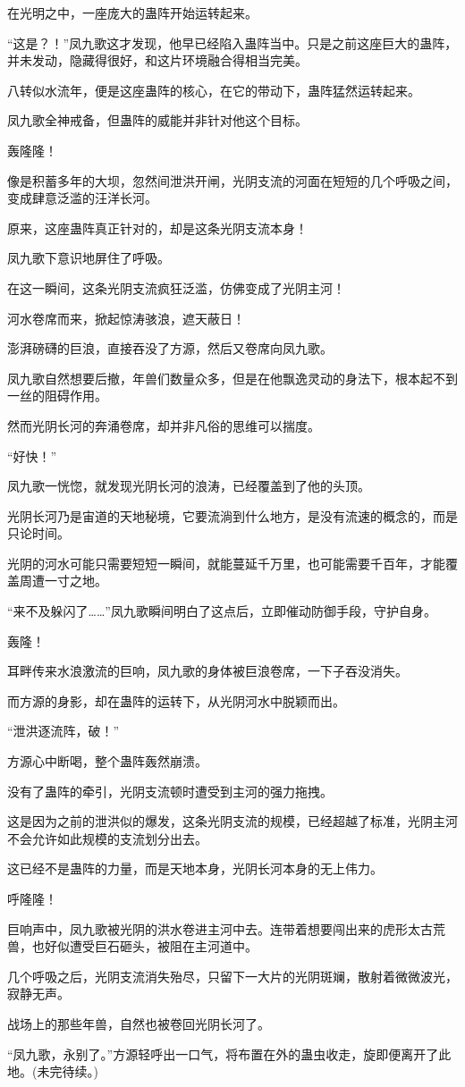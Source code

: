 \begin{this_body}
在光明之中，一座庞大的蛊阵开始运转起来。

“这是？！”凤九歌这才发现，他早已经陷入蛊阵当中。只是之前这座巨大的蛊阵，并未发动，隐藏得很好，和这片环境融合得相当完美。

八转似水流年，便是这座蛊阵的核心，在它的带动下，蛊阵猛然运转起来。

凤九歌全神戒备，但蛊阵的威能并非针对他这个目标。

轰隆隆！

像是积蓄多年的大坝，忽然间泄洪开闸，光阴支流的河面在短短的几个呼吸之间，变成肆意泛滥的汪洋长河。

原来，这座蛊阵真正针对的，却是这条光阴支流本身！

凤九歌下意识地屏住了呼吸。

在这一瞬间，这条光阴支流疯狂泛滥，仿佛变成了光阴主河！

河水卷席而来，掀起惊涛骇浪，遮天蔽日！

澎湃磅礴的巨浪，直接吞没了方源，然后又卷席向凤九歌。

凤九歌自然想要后撤，年兽们数量众多，但是在他飘逸灵动的身法下，根本起不到一丝的阻碍作用。

然而光阴长河的奔涌卷席，却并非凡俗的思维可以揣度。

“好快！”

凤九歌一恍惚，就发现光阴长河的浪涛，已经覆盖到了他的头顶。

光阴长河乃是宙道的天地秘境，它要流淌到什么地方，是没有流速的概念的，而是只论时间。

光阴的河水可能只需要短短一瞬间，就能蔓延千万里，也可能需要千百年，才能覆盖周遭一寸之地。

“来不及躲闪了……”凤九歌瞬间明白了这点后，立即催动防御手段，守护自身。

轰隆！

耳畔传来水浪激流的巨响，凤九歌的身体被巨浪卷席，一下子吞没消失。

而方源的身影，却在蛊阵的运转下，从光阴河水中脱颖而出。

“泄洪逐流阵，破！”

方源心中断喝，整个蛊阵轰然崩溃。

没有了蛊阵的牵引，光阴支流顿时遭受到主河的强力拖拽。

这是因为之前的泄洪似的爆发，这条光阴支流的规模，已经超越了标准，光阴主河不会允许如此规模的支流划分出去。

这已经不是蛊阵的力量，而是天地本身，光阴长河本身的无上伟力。

呼隆隆！

巨响声中，凤九歌被光阴的洪水卷进主河中去。连带着想要闯出来的虎形太古荒兽，也好似遭受巨石砸头，被阻在主河道中。

几个呼吸之后，光阴支流消失殆尽，只留下一大片的光阴斑斓，散射着微微波光，寂静无声。

战场上的那些年兽，自然也被卷回光阴长河了。

“凤九歌，永别了。”方源轻呼出一口气，将布置在外的蛊虫收走，旋即便离开了此地。(未完待续。)

\end{this_body}

